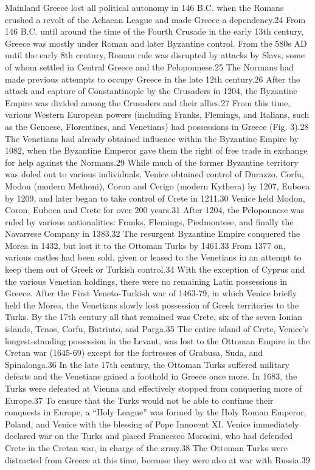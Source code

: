 \documentclass[english,]{book}
\begin{document}
Mainland Greece lost all political autonomy in 146 B.C. when the Romans crushed a revolt of the Achaean League and made Greece a dependency.24 From 146 B.C. until around the time of the Fourth Crusade in the early 13th century, Greece was mostly under Roman and later Byzantine control. From the 580s AD until the early 8th century, Roman rule was disrupted by attacks by Slavs, some of whom settled in Central Greece and the Peloponnese.25 The Normans had made previous attempts to occupy Greece in the late 12th century.26 After the attack and capture of Constantinople by the Crusaders in 1204, the Byzantine Empire was divided among the Crusaders and their allies.27 From this time, various Western European powers (including Franks, Flemings, and Italians, such as the Genoese, Florentines, and Venetians) had possessions in Greece (Fig. 3).28
The Venetians had already obtained influence within the Byzantine Empire by 1082, when the Byzantine Emperor gave them the right of free trade in exchange for help against the Normans.29 While much of the former Byzantine territory was doled out to various individuals, Venice obtained control of Durazzo, Corfu, Modon (modern Methoni), Coron and Cerigo (modern Kythera) by 1207, Euboea by 1209, and later began to take control of Crete in 1211.30 Venice held Modon, Coron, Euboea and Crete for over 200 years.31 After 1204, the Peloponnese was ruled by various nationalities: Franks, Flemings, Piedmontese, and finally the Navarrese Company in 1383.32 The resurgent Byzantine Empire conquered the Morea in 1432, but lost it to the Ottoman Turks by 1461.33 From 1377 on, various castles had been sold, given or leased to the Venetians in an attempt to keep them out of Greek or Turkish control.34 With the exception of Cyprus and the various Venetian holdings, there were no remaining Latin possessions in Greece.
After the First Veneto-Turkish war of 1463-79, in which Venice briefly held the Morea, the Venetians slowly lost possession of Greek territories to the Turks. By the 17th century all that remained was Crete, six of the seven Ionian islands, Tenos, Corfu, Butrinto, and Parga.35 The entire island of Crete, Venice's longest-standing possession in the Levant, was lost to the Ottoman Empire in the Cretan war (1645-69) except for the fortresses of Grabusa, Suda, and Spinalonga.36
In the late 17th century, the Ottoman Turks suffered military defeats and the Venetians gained a foothold in Greece once more. In 1683, the Turks were defeated at Vienna and effectively stopped from conquering more of Europe.37 To ensure that the Turks would not be able to continue their conquests in Europe, a ``Holy League'' was formed by the Holy Roman Emperor, Poland, and Venice with the blessing of Pope Innocent XI. Venice immediately declared war on the Turks and placed Francesco Morosini, who had defended Crete in the Cretan war, in charge of the army.38 The Ottoman Turks were distracted from Greece at this time, because they were also at war with Russia.39
\end{document}
